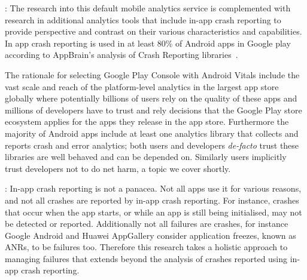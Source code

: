 : The research into this default mobile analytics service is complemented with research in additional analytics tools that include in-app crash reporting to provide perspective and contrast on their various characteristics and capabilities. %
In app crash reporting is used in at least 80\% of Android apps in Google play according to AppBrain's analysis of Crash Reporting libraries~.


The rationale for selecting Google Play Console with Android Vitals include the vast scale and reach of the platform-level analytics in the largest app store globally where potentially billions of users rely on the quality of these apps and millions of developers have to trust and rely decisions that the Google Play store ecosystem applies for the apps they release in the app store. Furthermore the majority of Android apps include at least one analytics library that collects and reports crash and error analytics; both users and developers \emph{de-facto} trust these libraries are well behaved and can be depended on. Similarly users implicitly trust developers not to do net harm, a topic we cover shortly. %


: In-app crash reporting is not a panacea. Not all apps use it for various reasons, and not all crashes are reported by in-app crash reporting. For instance, crashes that occur when the app starts, or while an app is still being initialised, may not be detected or reported. Additionally not all failures are crashes, for instance Google Android and Huawei AppGallery consider application freezes, known as ANRs, to be failures too. Therefore this research takes a holistic approach to managing failures that extends beyond the analysis of crashes reported using in-app crash reporting.   %

